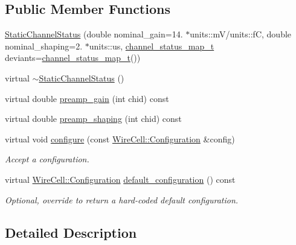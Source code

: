 \subsection*{Public Member Functions}
\begin{DoxyCompactItemize}
\item 
\hyperlink{class_wire_cell_1_1_gen_1_1_static_channel_status_a94d1d6619949026ab36f0f7a641512ec}{Static\+Channel\+Status} (double nominal\+\_\+gain=14. $\ast$units\+::mV/units\+::fC, double nominal\+\_\+shaping=2. $\ast$units\+::us, \hyperlink{class_wire_cell_1_1_gen_1_1_static_channel_status_af2f193308d13e8a6c5815d8021499803}{channel\+\_\+status\+\_\+map\+\_\+t} deviants=\hyperlink{class_wire_cell_1_1_gen_1_1_static_channel_status_af2f193308d13e8a6c5815d8021499803}{channel\+\_\+status\+\_\+map\+\_\+t}())
\item 
virtual \hyperlink{class_wire_cell_1_1_gen_1_1_static_channel_status_a815f8be21bd561e2c3baf50eb7d056f9}{$\sim$\+Static\+Channel\+Status} ()
\item 
virtual double \hyperlink{class_wire_cell_1_1_gen_1_1_static_channel_status_a7a43a5c1f263a985a705b24669b8cda1}{preamp\+\_\+gain} (int chid) const
\item 
virtual double \hyperlink{class_wire_cell_1_1_gen_1_1_static_channel_status_a8275297c1a7d034e3050827eaa8d6fb1}{preamp\+\_\+shaping} (int chid) const
\item 
virtual void \hyperlink{class_wire_cell_1_1_gen_1_1_static_channel_status_a38b20d71c1ac913ae7fc278e2a20928b}{configure} (const \hyperlink{namespace_wire_cell_a9f705541fc1d46c608b3d32c182333ee}{Wire\+Cell\+::\+Configuration} \&config)
\begin{DoxyCompactList}\small\item\em Accept a configuration. \end{DoxyCompactList}\item 
virtual \hyperlink{namespace_wire_cell_a9f705541fc1d46c608b3d32c182333ee}{Wire\+Cell\+::\+Configuration} \hyperlink{class_wire_cell_1_1_gen_1_1_static_channel_status_a87b0418767237ba9a5bb40f71e9b82d2}{default\+\_\+configuration} () const
\begin{DoxyCompactList}\small\item\em Optional, override to return a hard-\/coded default configuration. \end{DoxyCompactList}\end{DoxyCompactItemize}


\subsection{Detailed Description}


